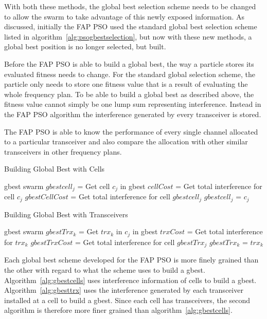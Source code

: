 With both these methods, the global best selection scheme needs to be changed to allow the swarm to take advantage of this newly exposed information. As discussed, initially the FAP PSO used the standard global best selection scheme listed in algorithm~\ref{alg:psogbestselection}, but now with these new methods, a global best position is no longer selected, but built.

Before the FAP PSO is able to build a global best, the way a particle stores its evaluated fitness needs to change. For the standard global selection scheme, the particle only needs to store one fitness value that is a result of evaluating the whole frequency plan. To be able to build a global best as described above, the fitness value cannot simply be one lump sum representing interference. Instead in the FAP PSO algorithm the interference generated by every transceiver is stored.

The FAP PSO is able to know the performance of every single channel allocated to a particular transceiver and also compare the allocation with other similar transceivers in other frequency plans.

\begin{algorithm}
\caption{Building Global Best with Cells}
\label{alg:gbestcells}
\begin{algorithmic}[1]
\Require gbest
\Require swarm
		\State $gbestcell_j$ = Get cell $c_j$ in gbest
		\State $cellCost$ = Get total interference for cell $c_j$
		\State $gbestCellCost$ = Get total interference for cell $gbestcell_j$
			\State $gbestcell_j$ = $c_j$
		\EndIf
	\EndFor
\EndFor
\end{algorithmic}
\end{algorithm}

\begin{algorithm}
\caption{Building Global Best with Transceivers}
\label{alg:gbesttrx}
\begin{algorithmic}[1]
\Require gbest
\Require swarm
			\State $gbestTrx_k$ = Get $trx_k$ in $c_j$ in gbest
			\State $trxCost$ = Get total interference for $trx_k$
			\State $gbestTrxCost$ = Get total interference for cell $gbestTrx_j$
				\State $gbestTrx_k$ = $trx_k$
			\EndIf
		\EndFor
	\EndFor
\EndFor
\end{algorithmic}
\end{algorithm}
Each global best scheme developed for the FAP PSO is more finely grained than the other with regard to what the scheme uses to build a gbest. Algorithm~\ref{alg:gbestcells} uses interference information of cells to build a gbest. Algorithm~\ref{alg:gbesttrx} uses the interference generated by each transceiver installed at a cell to build a gbest. Since each cell has transceivers, the second algorithm is therefore more finer grained than algorithm~\ref{alg:gbestcells}.

